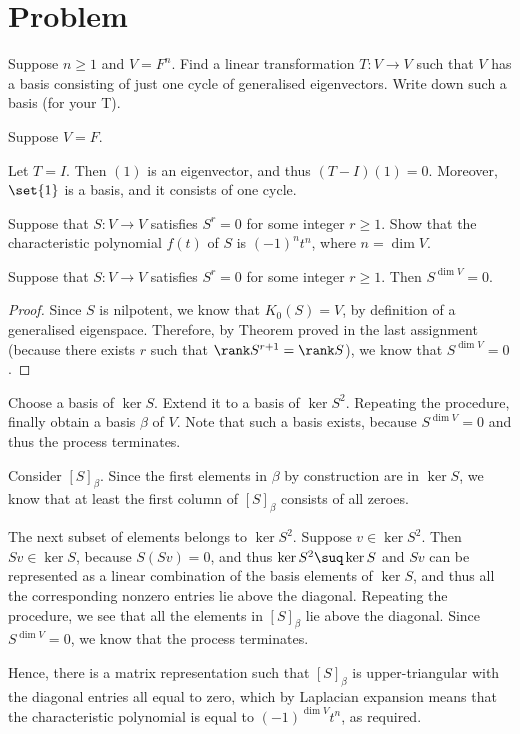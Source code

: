 \documentclass[11pt]{scrartcl}
\begin{document}
\section{Problem}

\begin{problem*}
Suppose $n \ge 1$ and $V = F^n$. Find a linear transformation $T : V \to V$ such that $V$ has a basis consisting of just one cycle of generalised eigenvectors. Write down such a basis (for your T).
\end{problem*}
\begin{soln}
  \hfill

Suppose $V = F$.

Let $T = I$. Then $(1)$ is an eigenvector, and thus $(T-I)(1) = 0$. Moreover, $\set{1}$ is a basis, and it consists of one cycle.
\end{soln}

\begin{problem*}
Suppose that $S : V \to V$ satisfies $S^r = 0$ for some integer $r \ge 1$. Show that the characteristic polynomial $f(t)$ of $S$ is $(-1)^n t^n$, where $n = \dim V$. 
\end{problem*}

\begin{lemma}
Suppose that $S : V \to V$ satisfies $S^r = 0$ for some integer $r \ge 1$. Then $S^{\dim V} = 0$.
\end{lemma}
\begin{proof}
  \hfill

  Since $S$ is nilpotent, we know that $K_0(S) = V$, by definition of
  a generalised eigenspace.  Therefore, by Theorem proved in the last
  assignment (because there exists $r$ such that
  $\rank S^{r+1} = \rank S$), we know that $S^{\dim V} = 0$.
\end{proof}

\begin{soln}
  \hfill

  Choose a basis of $\ker S$. Extend it to a basis of $\ker
  S^{2}$. Repeating the procedure, finally obtain a basis $\beta$ of
  $V$. Note that such a basis exists, because $S^{\dim V} = 0$ and
  thus the process terminates.

  Consider $[S]_{\beta}$. Since the first elements in $\beta$ by
  construction are in $\ker S$, we know that at least the first column
  of $[S]_{\beta}$ consists of all zeroes.

  The next subset of elements belongs to $\ker S^2$. Suppose
  $v\in\ker S^2$. Then $S v \in \ker S$, because $S(Sv) = 0$, and thus
  $\ker S^2 \suq \ker S$ and $Sv$ can be represented as a linear
  combination of the basis elements of $\ker S$, and thus all the
  corresponding nonzero entries lie above the diagonal. Repeating the
  procedure, we see that all the elements in $[S]_{\beta}$ lie above
  the diagonal. Since $S^{\dim V} = 0$, we know that the process
  terminates.

  Hence, there is a matrix representation such that $[S]_{\beta}$ is
  upper-triangular with the diagonal entries all equal to zero, which
  by Laplacian expansion means that the characteristic polynomial is
  equal to $(-1)^{\dim V}t^n$, as required.
\end{soln}
\end{document}
